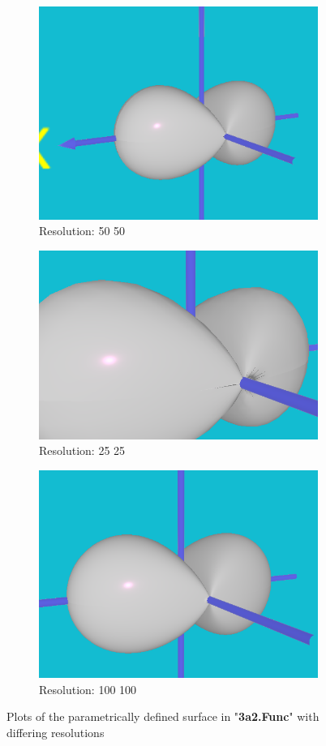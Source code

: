 \documentclass[acmlarge,nonacm=true]{acmart}
\begin{document}
\begin{figure}[H]
	\begin{subfigure}{.33\textwidth}
		\centering
		\includegraphics[width=.8\linewidth]{fig/3aii_50_50.PNG}
		\caption{Resolution: 50 50}
	\end{subfigure}%
	\begin{subfigure}{.33\textwidth}
		\centering
		\includegraphics[width=.8\linewidth]{fig/3aii_25_25.PNG}
		\caption{Resolution: 25 25}
	\end{subfigure}
	\begin{subfigure}{.33\textwidth}
			\centering
			\includegraphics[width=.8\linewidth]{fig/3aii_100_100.PNG}
			\caption{Resolution: 100 100}
	\end{subfigure}
	\caption{Plots of the parametrically defined surface in "\textbf{3a2.Func}" with differing resolutions}
	\label{fig:3a2}
\end{figure}
\end{document}
